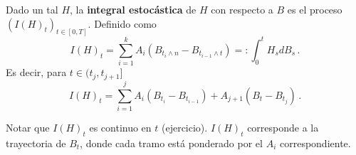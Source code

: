 \begin{definition}
Dado un tal $H$, la \textbf{integral estocástica} de $H$ con respecto a $B$ es el proceso $\left(I(H)_t \right)_{t \in [0,T]}$. Definido como 
\begin{equation*}
    I(H)_t = \sum_{i=1}^{k} A_i \left( B_{t_i \wedge n} - B_{t_{i-1} \wedge t} \right) =: \int_{0}^{t} H_s dB_s\,.
\end{equation*}
Es decir, para $t \in (t_j, t_{j+1}]$ 
\begin{equation*}
    I(H)_t = \sum_{i=1}^{j} A_i\left( B_{t_i} - B_{t_{i-1}}  \right) + A_{j+1}(B_t - B_{t_{j}})\,.
\end{equation*}
\end{definition}
Notar que $I(H)_t$ es continuo en $t$ (ejercicio). $I(H)_{t}$ corresponde a la trayectoria de $B_t$, donde cada tramo está ponderado por el $A_i$ correspondiente. 

